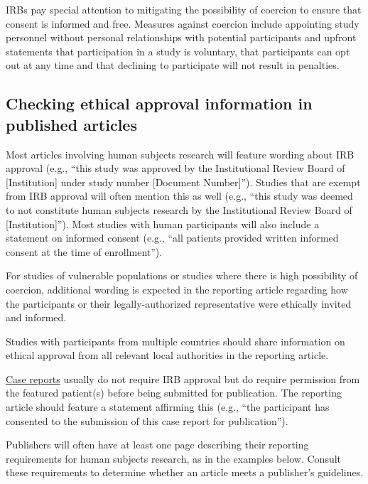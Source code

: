 \documentclass[letterpaper, 12pt]{article}
\begin{document}
IRBs pay special attention to mitigating the possibility of coercion to ensure that consent is informed and free. Measures against coercion include appointing study personnel without personal relationships with potential participants and upfront statements that participation in a study is voluntary, that participants can opt out at any time and that declining to participate will not result in penalties.

\subsection*{Checking ethical approval information in published articles}

Most articles involving human subjects research will feature wording about IRB approval (e.g., ``this study was approved by the Institutional Review Board of [Institution] under study number [Document Number]''). Studies that are exempt from IRB approval will often mention this as well (e.g., ``this study was deemed to not constitute human subjects research by the Institutional Review Board of [Institution]''). Most studies with human participants will also include a statement on informed consent (e.g., ``all patients provided written informed consent at the time of enrollment''). 

For studies of vulnerable populations or studies where there is high possibility of coercion, additional wording is expected in the reporting article regarding how the participants or their legally-authorized representative were ethically invited and informed.

Studies with participants from multiple countries should share information on ethical approval from all relevant local authorities in the reporting article.

\href{https://en.wikipedia.org/wiki/Case_report}{Case reports} usually do not require IRB approval but do require permission from the featured patient(s) before being submitted for publication. The reporting article should feature a statement affirming this (e.g., ``the participant has consented to the submission of this case report for publication'').

Publishers will often have at least one page describing their reporting requirements for human subjects research, as in the examples below. Consult these requirements to determine whether an article meets a publisher's guidelines.
\end{document}
